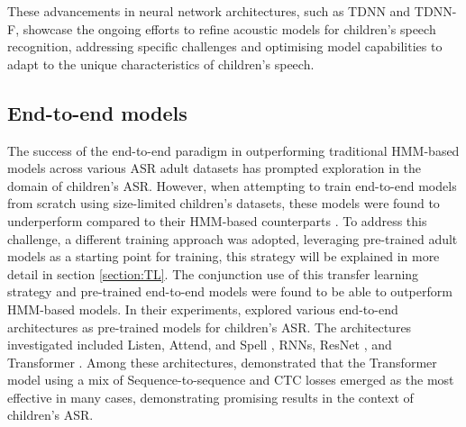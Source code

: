 These advancements in neural network architectures, such as \ac{TDNN} and \ac{TDNN-F}, showcase the ongoing efforts to refine acoustic models for children's speech recognition, addressing specific challenges and optimising model capabilities to adapt to the unique characteristics of children's speech.


\subsection{End-to-end models}
The success of the end-to-end paradigm in outperforming traditional \ac{HMM}-based models across various \ac{ASR} adult datasets has prompted exploration in the domain of children's \ac{ASR}. However, when attempting to train end-to-end models from scratch using size-limited children's datasets, these models were found to underperform compared to their \ac{HMM}-based counterparts \cite{gelin2021endtoend}. To address this challenge, a different training approach was adopted, leveraging pre-trained adult models as a starting point for training, this strategy will be explained in more detail in section \ref{section:TL}. The conjunction use of this transfer learning strategy and pre-trained end-to-end models were found to be able to outperform \ac{HMM}-based models. In their experiments, \cite{gelin2021endtoend,sri_end2end,chen2020data,ng2020cuhk} explored various end-to-end architectures as pre-trained models for children's \ac{ASR}. The architectures investigated included Listen, Attend, and Spell \cite{chan2015listen}, \acp{RNN}, ResNet \cite{targ2016resnet}, and Transformer \cite{Transformer}. Among these architectures, \cite{gelin2021endtoend} demonstrated that the Transformer model using a mix of Sequence-to-sequence and \ac{CTC} losses emerged as the most effective in many cases, demonstrating promising results in the context of children's \ac{ASR}.

